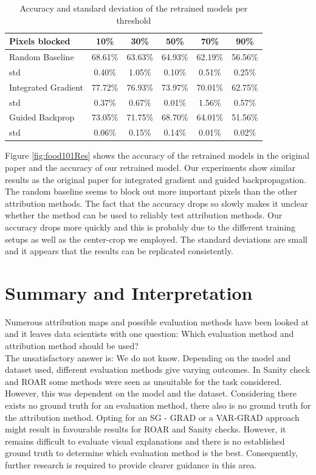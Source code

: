 \begin{table}[H]
	\centering
	\begin{tabular}{|l|c|c|c|c|c|}
		\hline
		Pixels blocked & 10\% & 30\% & 50\% & 70\% & 90\% \\
		\hline
		Random Baseline & 68.61\% & 63.63\% & 64.93\% & 62.19\% & 56.56\% \\
		std & 0.40\% & 1.05\% & 0.10\% & 0.51\% & 0.25\% \\
		\hline
		Integrated Gradient & 77.72\% & 76.93\% & 73.97\% & 70.01\% & 62.75\% \\
		std & 0.37\% & 0.67\% & 0.01\% & 1.56\% & 0.57\% \\
		\hline
		Guided Backprop & 73.05\% & 71.75\% & 68.70\% & 64.01\% & 51.56\% \\
		std & 0.06\% & 0.15\% & 0.14\% & 0.01\% & 0.02\% \\
		\hline
		
	\end{tabular} \newline
	
	\caption{Accuracy and standard deviation of the retrained models per threshold}
	\label{tab:sclass_precision_ig}
\end{table}


Figure \ref{fig:food101Res} shows the accuracy of the retrained models in the original paper and the accuracy of our retrained model. Our experiments show similar results as the original paper for integrated gradient and guided backpropagation. The random baseline seems to block out more important pixels than the other attribution methods. The fact that the accuracy drops so slowly makes it unclear whether the method can be used to reliably test attribution methods. Our accuracy drops more quickly and this is probably due to the different training setups as well as the center-crop we employed. The standard deviations are small and it appears that the results can be replicated consistently.

\chapter{Summary and Interpretation}
\label{sec:summary}

Numerous attribution maps and possible evaluation methods have been looked at and it leaves data scientists with one question: Which evaluation method and attribution method should be used?
\\
The unsatisfactory answer is: We do not know. Depending on the model and dataset used, different evaluation methods give varying outcomes. In Sanity check\cite{adebayo2020sanity} and ROAR \cite{hooker2019benchmark} some methods were seen as unsuitable for the task considered. However, this was dependent on the model and the dataset. Considering there exists no ground truth for an evaluation method, there also is no ground truth for the attribution method. Opting for an SG - GRAD or a VAR-GRAD approach might result in favourable results for ROAR and Sanity checks. However, it remains difficult to evaluate visual explanations and there is no established ground truth to determine which evaluation method is the best. Consequently, further research is required to provide clearer guidance in this area.

